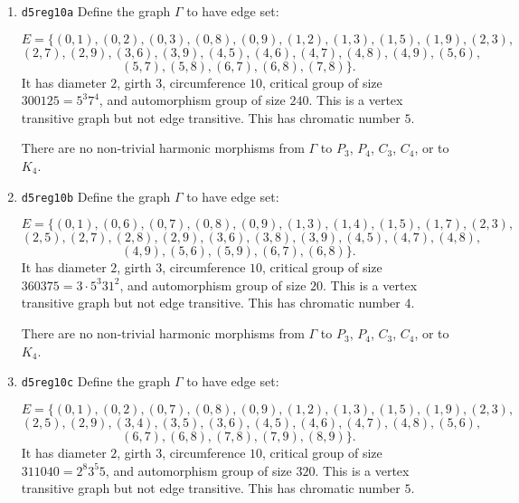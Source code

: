\documentclass[12pt,letterpaper]{article}
\theoremstyle{definition}
\begin{document}
\begin{enumerate}
\item
  {\tt d5reg10a}\newline
  Define the graph  $\Gamma$
to have edge set:

\[
E = \{
(0, 1), (0, 2), (0, 3), (0, 8), (0, 9), (1, 2), (1, 3), (1, 5), (1, 9), (2, 3),
\]
\[
(2, 7), (2, 9), (3, 6), (3, 9), (4, 5), (4, 6), (4, 7), (4, 8), (4, 9), (5, 6),
\]
\[
(5, 7), (5, 8), (6, 7), (6, 8), (7, 8)
\}.
\]
It has diameter $2$,
girth $3$, circumference $10$, 
critical group of size $300125 = 5^3 7^4$, 
and automorphism group of size $240$. This is a vertex transitive graph but not
edge transitive.
This has chromatic number $5$.

There are no non-trivial harmonic morphisms from $\Gamma$ to $P_3$, $P_4$, $C_3$, $C_4$, or to $K_4$.


\item
  {\tt d5reg10b}\newline
  Define the graph  $\Gamma$
  to have edge set:

\[
E = \{
(0, 1), (0, 6), (0, 7), (0, 8), (0, 9), (1, 3), (1, 4), (1, 5),(1, 7), (2, 3),
\]
\[
(2, 5), (2, 7), (2, 8), (2, 9), (3, 6), (3, 8), (3, 9), (4, 5), (4, 7), (4, 8),
\]
\[
(4, 9), (5, 6), (5, 9), (6, 7), (6, 8)
\}.
\]
It has diameter $2$,
girth $3$, circumference $10$, 
critical group of size $360375 = 3\cdot 5^3 31^2$, 
and automorphism group of size $20$. This is a vertex transitive graph but not
edge transitive.
This has chromatic number $4$.

There are no non-trivial harmonic morphisms from $\Gamma$ to $P_3$, $P_4$, $C_3$, $C_4$, or to $K_4$.

\item
  {\tt d5reg10c}\newline
  Define the graph $\Gamma$
to have edge set:

\[
E = \{
(0, 1), (0, 2), (0, 7), (0, 8), (0, 9), (1, 2), (1, 3), (1, 5), (1, 9), (2, 3),
\]
\[
(2, 5), (2, 9), (3, 4), (3, 5), (3, 6), (4, 5), (4, 6), (4, 7), (4, 8), (5, 6), \]
\[
(6, 7), (6, 8), (7, 8), (7, 9), (8, 9)
\}.
\]
It has diameter $2$,
girth $3$, circumference $10$, 
critical group of size $311040 = 2^8 3^5 5$, 
and automorphism group of size $320$. This is a vertex transitive graph but not
edge transitive.
This has chromatic number $5$.


\end{enumerate}
\end{document}
